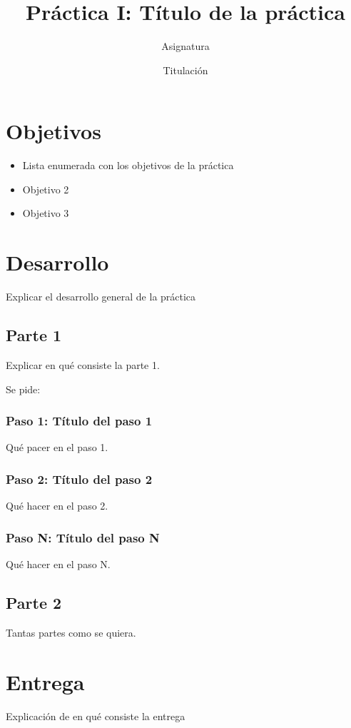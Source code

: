\documentclass[a4paper,11pt]{article}
\author{Asignatura}
\date{Titulación}
\title{Práctica I: Título de la práctica}
\begin{document}
\maketitle

\section{Objetivos}
\label{sec:org947739e}

\begin{itemize}
\item Lista enumerada con los objetivos de la práctica
\item Objetivo 2
\item Objetivo 3
\end{itemize}

\section{Desarrollo}
\label{sec:orge7403a4}

Explicar el desarrollo general de la práctica

\subsection{Parte 1}
\label{sec:org7bba41c}

Explicar en qué consiste la parte 1.

Se pide:

\subsubsection{Paso 1: Título del paso 1}
\label{sec:orgf098873}

Qué pacer en el paso 1.


\subsubsection{Paso 2: Título del paso 2}
\label{sec:org1e9b32b}

Qué hacer en el paso 2.

\subsubsection{Paso N: Título del paso N}
\label{sec:org43241f9}

Qué hacer en el paso N.

\subsection{Parte 2}
\label{sec:orga966d0a}

Tantas partes como se quiera.

\section{Entrega}
\label{sec:org4074bb8}

Explicación de en qué consiste la entrega
\end{document}
